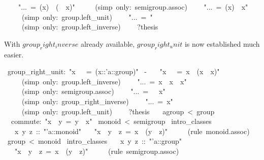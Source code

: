 \begin{isabelle}
~~~~{"}...~=~(x{\isasyminv}){\isasyminv}~{\isasymOtimes}~({\isasymunit}~{\isasymOtimes}~x{\isasyminv}){"}\isanewline
~~~~~(simp~only:~semigroup.assoc)\isanewline
~~~~{"}...~=~(x{\isasyminv}){\isasyminv}~{\isasymOtimes}~x{\isasyminv}{"}\isanewline
~~~~~(simp~only:~group.left\_unit)\isanewline
~~~~{"}...~=~{\isasymunit}{"}\isanewline
~~~~~(simp~only:~group.left\_inverse)\isanewline
~~~~?thesis~\isanewline
{}%
\begin{isamarkuptext}%
With $group_right_inverse$ already available,
 $group_right_unit$\label{thm:group-right-unit} is now established
 much easier.%
\end{isamarkuptext}%
~group\_right\_unit:~{"}x~{\isasymOtimes}~{\isasymunit}~=~(x::'a::group){"}\isanewline
{}~-\isanewline
~~~{"}x~{\isasymOtimes}~{\isasymunit}~=~x~{\isasymOtimes}~(x{\isasyminv}~{\isasymOtimes}~x){"}\isanewline
~~~~~(simp~only:~group.left\_inverse)\isanewline
~~~~{"}...~=~x~{\isasymOtimes}~x{\isasyminv}~{\isasymOtimes}~x{"}\isanewline
~~~~~(simp~only:~semigroup.assoc)\isanewline
~~~~{"}...~=~{\isasymunit}~{\isasymOtimes}~x{"}\isanewline
~~~~~(simp~only:~group\_right\_inverse)\isanewline
~~~~{"}...~=~x{"}\isanewline
~~~~~(simp~only:~group.left\_unit)\isanewline
~~~~?thesis~\isanewline
{}\isanewline
\isanewline
\isanewline
{}\isanewline
~~agroup~<~group\isanewline
~~commute:~{"}x~{\isasymOtimes}~y~=~y~{\isasymOtimes}~x{"}\isanewline
\isanewline
\isanewline
\isanewline
{}~monoid~<~semigroup\isanewline
{}~intro\_classes\isanewline
~~~x~y~z~::~{"}'a::monoid{"}\isanewline
~~~{"}x~{\isasymOtimes}~y~{\isasymOtimes}~z~=~x~{\isasymOtimes}~(y~{\isasymOtimes}~z){"}\isanewline
~~~~~(rule~monoid.assoc)\isanewline
{}\isanewline
\isanewline
\isanewline
{}~group~<~monoid\isanewline
{}~intro\_classes\isanewline
~~~x~y~z~::~{"}'a::group{"}\isanewline
~~~{"}x~{\isasymOtimes}~y~{\isasymOtimes}~z~=~x~{\isasymOtimes}~(y~{\isasymOtimes}~z){"}\isanewline
~~~~~(rule~semigroup.assoc)\isanewline

\end{isabelle}
